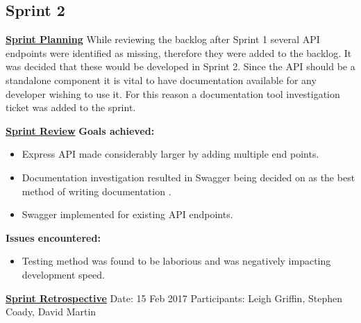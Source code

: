 \subsection{Sprint 2}
\underline{\textbf{Sprint Planning}}\newline
While reviewing the backlog after Sprint 1 several API endpoints were identified as missing, therefore they were added to the backlog. It was decided that these would be developed in Sprint 2. Since the API should be a standalone component it is vital to have documentation available for any developer wishing to use it. For this reason a documentation tool investigation ticket was added to the sprint.

\underline{\textbf{Sprint Review}}\newline
\textbf{Goals achieved:}
\begin{itemize}
	\item Express API made considerably larger by adding multiple end points.
	\item Documentation investigation resulted in Swagger being decided on as the best method of writing documentation \citep{Swagger2017}. 
	\item Swagger implemented for existing API endpoints.
\end{itemize}

\textbf{Issues encountered:}
\begin{itemize}
	\item Testing method was found to be laborious and was negatively impacting development speed.
\end{itemize}

\underline{\textbf{Sprint Retrospective}}\newline
Date: 15 Feb 2017\newline
Participants: Leigh Griffin, Stephen Coady, David Martin


